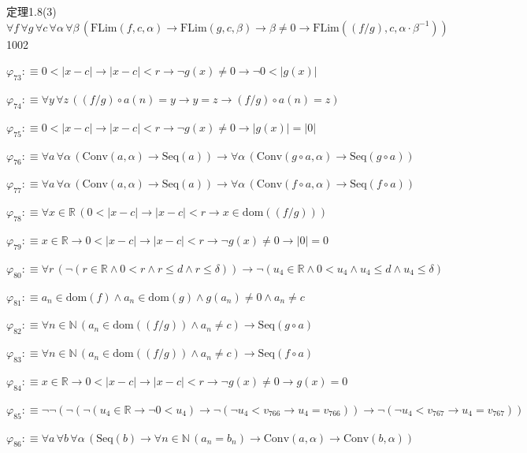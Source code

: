 \begin{fullproof}{定理1.8(3)}{$\forall f\,\forall g\,\forall c\,\forall \alpha\,\forall \beta\,(\mathrm{FLim}(f,c,\alpha) \to \mathrm{FLim}(g,c,\beta) \to \beta \neq 0 \to \mathrm{FLim}((f / g),c,\alpha \cdot \beta^{-1}))$}{1002}
\begin{abbrevlist}
\item $\varphi_{73} :\equiv 0 < \lvert x - c \rvert \to \lvert x - c \rvert < r \to \neg g(x) \neq 0 \to \neg 0 < \lvert g(x) \rvert$
\item $\varphi_{74} :\equiv \forall y\,\forall z\,((f / g) \circ a(n) = y \to y = z \to (f / g) \circ a(n) = z)$
\item $\varphi_{75} :\equiv 0 < \lvert x - c \rvert \to \lvert x - c \rvert < r \to \neg g(x) \neq 0 \to \lvert g(x) \rvert = \lvert 0 \rvert$
\item $\varphi_{76} :\equiv \forall a\,\forall \alpha\,(\mathrm{Conv}(a,\alpha) \to \mathrm{Seq}(a)) \to \forall \alpha\,(\mathrm{Conv}(g \circ a,\alpha) \to \mathrm{Seq}(g \circ a))$
\item $\varphi_{77} :\equiv \forall a\,\forall \alpha\,(\mathrm{Conv}(a,\alpha) \to \mathrm{Seq}(a)) \to \forall \alpha\,(\mathrm{Conv}(f \circ a,\alpha) \to \mathrm{Seq}(f \circ a))$
\item $\varphi_{78} :\equiv \forall x \in \mathbb{R}\,(0 < \lvert x - c \rvert \to \lvert x - c \rvert < r \to x \in \mathrm{dom}((f / g)))$
\item $\varphi_{79} :\equiv x \in \mathbb{R} \to 0 < \lvert x - c \rvert \to \lvert x - c \rvert < r \to \neg g(x) \neq 0 \to \lvert 0 \rvert = 0$
\item $\varphi_{80} :\equiv \forall r\,(\neg (r \in \mathbb{R} \land 0 < r \land r \leq d \land r \leq \delta)) \to \neg (u_{4} \in \mathbb{R} \land 0 < u_{4} \land u_{4} \leq d \land u_{4} \leq \delta)$
\item $\varphi_{81} :\equiv a_{n} \in \mathrm{dom}(f) \land a_{n} \in \mathrm{dom}(g) \land g(a_{n}) \neq 0 \land a_{n} \neq c$
\item $\varphi_{82} :\equiv \forall n \in \mathbb{N}\,(a_{n} \in \mathrm{dom}((f / g)) \land a_{n} \neq c) \to \mathrm{Seq}(g \circ a)$
\item $\varphi_{83} :\equiv \forall n \in \mathbb{N}\,(a_{n} \in \mathrm{dom}((f / g)) \land a_{n} \neq c) \to \mathrm{Seq}(f \circ a)$
\item $\varphi_{84} :\equiv x \in \mathbb{R} \to 0 < \lvert x - c \rvert \to \lvert x - c \rvert < r \to \neg g(x) \neq 0 \to g(x) = 0$
\item $\varphi_{85} :\equiv \neg \neg (\neg (\neg (u_{4} \in \mathbb{R} \to \neg 0 < u_{4}) \to \neg (\neg u_{4} < v_{766} \to u_{4} = v_{766})) \to \neg (\neg u_{4} < v_{767} \to u_{4} = v_{767}))$
\item $\varphi_{86} :\equiv \forall a\,\forall b\,\forall \alpha\,(\mathrm{Seq}(b) \to \forall n \in \mathbb{N}\,(a_{n} = b_{n}) \to \mathrm{Conv}(a,\alpha) \to \mathrm{Conv}(b,\alpha))$

\end{abbrevlist}
\end{fullproof}
